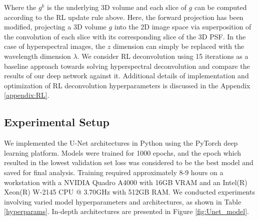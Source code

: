 \documentclass{article}
\begin{document}
Where the $g^k$ is the underlying 3D volume and each slice of $g$ can be computed according to the RL update rule above. Here, the forward projection has been modified, projecting a 3D volume $g$ into the 2D image space via superposition of the convolution of each slice with its corresponding slice of the 3D PSF. In the case of hyperspectral images, the $z$ dimension can simply be replaced with the wavelength dimension $\lambda$. We consider RL deconvolution using 15 iterations as a baseline approach towards solving hyperspectral deconvolution and compare the results of our deep network against it. Additional details of implementation and optimization of RL deconvolution hyperparameters is discussed in the Appendix \ref{appendix:RL}.

\subsection{Experimental Setup}
We implemented the U-Net architectures in Python using the PyTorch deep learning platform. Models were trained for 1000 epochs, and the epoch which resulted in the lowest validation set loss was considered to be the best model and saved for final analysis. Training required approximately 8-9 hours on a workstation with a NVIDIA Quadro A4000 with 16GB VRAM and an Intel(R) Xeon(R) W-2145 CPU @ 3.70GHz with 512GB RAM. We conducted experiments involving varied model hyperparameters and architectures, as shown in Table \ref{hyperparams}. In-depth architectures are presented in Figure \ref{fig:Unet_model}.

\begin{table}
  \caption{Experimental Hyperparameters}
  \label{hyperparams}
  \centering
\end{table}
\end{document}

